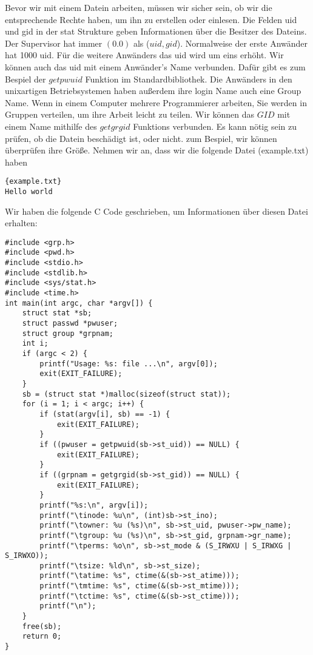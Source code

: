 \documentclass{article}[12pt]
\begin{document}
Bevor wir mit einem Datein arbeiten, müssen wir sicher sein, ob wir die entsprechende Rechte haben, um ihn zu 
erstellen oder einlesen. Die Felden uid und gid in der stat Strukture geben Informationen über die Besitzer des Dateins.
Der Supervisor hat immer $(0.0)$ als ($uid,gid$). Normalweise der erste Anwänder hat 1000 uid.
Für die weitere Anwänders das uid wird um eins erhöht. 
Wir können auch das uid mit einem Anwänder's Name verbunden. Dafür gibt es zum Bespiel der $getpwuid$ Funktion 
im Standardbibliothek. Die Anwänders in den unixartigen Betriebsystemen haben außerdem ihre login Name auch eine
Group Name. Wenn in einem Computer mehrere Programmierer arbeiten, Sie werden in Gruppen verteilen, um ihre
Arbeit leicht zu teilen. Wir können das $GID$ mit einem Name mithilfe des $getgrgid$ Funktions verbunden.
Es kann nötig sein zu prüfen, ob die Datein beschädigt ist, oder nicht. 
zum Bespiel, wir können überprüfen ihre Größe. Nehmen wir an, dass wir die folgende Datei (example.txt) haben
\begin{lstlisting}{example.txt}
Hello world
\end{lstlisting}
Wir haben die folgende C Code geschrieben, um Informationen über diesen Datei erhalten:
\begin{lstlisting}
#include <grp.h>
#include <pwd.h>
#include <stdio.h>
#include <stdlib.h>
#include <sys/stat.h>
#include <time.h>
int main(int argc, char *argv[]) {
    struct stat *sb;
    struct passwd *pwuser;
    struct group *grpnam;
    int i;
    if (argc < 2) {
        printf("Usage: %s: file ...\n", argv[0]);
        exit(EXIT_FAILURE);
    }
    sb = (struct stat *)malloc(sizeof(struct stat));
    for (i = 1; i < argc; i++) {
        if (stat(argv[i], sb) == -1) {
            exit(EXIT_FAILURE);
        }
        if ((pwuser = getpwuid(sb->st_uid)) == NULL) {
            exit(EXIT_FAILURE);
        }
        if ((grpnam = getgrgid(sb->st_gid)) == NULL) {
            exit(EXIT_FAILURE);
        }
        printf("%s:\n", argv[i]);
        printf("\tinode: %u\n", (int)sb->st_ino);
        printf("\towner: %u (%s)\n", sb->st_uid, pwuser->pw_name);
        printf("\tgroup: %u (%s)\n", sb->st_gid, grpnam->gr_name);
        printf("\tperms: %o\n", sb->st_mode & (S_IRWXU | S_IRWXG | S_IRWXO));
        printf("\tsize: %ld\n", sb->st_size);
        printf("\tatime: %s", ctime(&(sb->st_atime)));
        printf("\tmtime: %s", ctime(&(sb->st_mtime)));
        printf("\tctime: %s", ctime(&(sb->st_ctime)));
        printf("\n");
    }
    free(sb);
    return 0;
}
\end{lstlisting}
\end{document}
